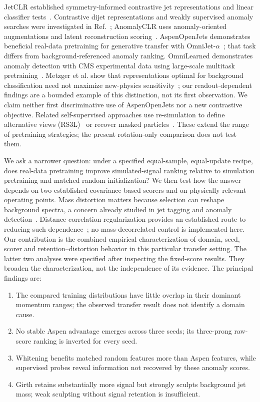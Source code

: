 \documentclass[11pt,a4paper]{article}
\begin{document}
JetCLR established symmetry-informed contrastive jet representations and linear
classifier tests~\cite{jetclr}. Contrastive dijet representations and weakly
supervised anomaly searches were investigated in Ref.~\cite{dillon2022}; AnomalyCLR
uses anomaly-oriented augmentations and latent reconstruction scoring~\cite{anomalyclr}.
AspenOpenJets demonstrates beneficial real-data pretraining for generative transfer
with OmniJet-$\alpha$~\cite{aspen,omnijet}; that task differs from background-referenced
anomaly ranking. OmniLearned demonstrates anomaly detection with CMS experimental
data using large-scale multitask pretraining~\cite{omnilearned}. Metzger et al.
show that representations optimal for background classification need not maximize
new-physics sensitivity~\cite{metzger}; our readout-dependent findings are a bounded
example of this distinction, not its first observation. We claim neither
first discriminative use of AspenOpenJets nor a new contrastive objective.
Related self-supervised approaches use re-simulation to define alternative views
(RS3L)~\cite{rs3l} or recover masked particles~\cite{mpm}. These extend the range
of pretraining strategies; the present rotation-only comparison does not test them.

We ask a narrower question: under a specified equal-sample, equal-update recipe,
does real-data pretraining improve simulated-signal ranking relative to simulation
pretraining and matched random initialization? We then test how the answer depends
on two established covariance-based scorers and on physically relevant operating
points. Mass distortion matters because selection can reshape background spectra,
a concern already studied in jet tagging and anomaly detection~\cite{ddt,massive}.
Distance-correlation regularization provides an established route to reducing
such dependence~\cite{disco}; no mass-decorrelated control is implemented here.
Our contribution is the combined empirical characterization of domain, seed,
scorer and retention--distortion behavior in this particular transfer setting.
The latter two analyses were specified after inspecting the fixed-score results.
They broaden the characterization, not the independence of its evidence.
The principal findings are:
\begin{enumerate}
\item The compared training distributions have little overlap in their dominant
momentum ranges; the observed transfer result does not identify a domain cause.
\item No stable Aspen advantage emerges across three seeds; its three-prong
raw-score ranking is inverted for every seed.
\item Whitening benefits matched random features more than Aspen features,
while supervised probes reveal information not recovered by these anomaly scores.
\item Girth retains substantially more signal but strongly sculpts background
jet mass; weak sculpting without signal retention is insufficient.
\end{enumerate}
\end{document}
